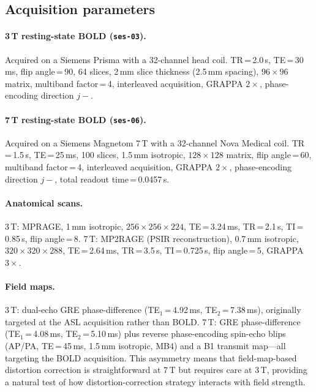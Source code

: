 \documentclass[11pt,a4paper]{article}
\begin{document}
\subsection{Acquisition parameters}

\paragraph{3\,T resting-state BOLD (\texttt{ses-03}).}
Acquired on a Siemens Prisma with a 32-channel head coil.  TR\,=\,2.0\,s, TE\,=\,30\,ms, flip angle\,=\,90\textdegree, 64 slices, 2\,mm slice thickness (2.5\,mm spacing), $96 \times 96$ matrix, multiband factor\,=\,4, interleaved acquisition, GRAPPA $2\times$, phase-encoding direction $j{-}$.

\paragraph{7\,T resting-state BOLD (\texttt{ses-06}).}
Acquired on a Siemens Magnetom 7\,T with a 32-channel Nova Medical coil.  TR\,=\,1.5\,s, TE\,=\,25\,ms, 100 slices, 1.5\,mm isotropic, $128 \times 128$ matrix, flip angle\,=\,60\textdegree, multiband factor\,=\,4, interleaved acquisition, GRAPPA $2\times$, phase-encoding direction $j{-}$, total readout time\,=\,0.0457\,s.

\paragraph{Anatomical scans.}
3\,T: MPRAGE, 1\,mm isotropic, $256 \times 256 \times 224$, TE\,=\,3.24\,ms, TR\,=\,2.1\,s, TI\,=\,0.85\,s, flip angle\,=\,8\textdegree.  7\,T: MP2RAGE (PSIR reconstruction), 0.7\,mm isotropic, $320 \times 320 \times 288$, TE\,=\,2.64\,ms, TR\,=\,3.5\,s, TI\,=\,0.725\,s, flip angle\,=\,5\textdegree, GRAPPA $3\times$.

\paragraph{Field maps.}
3\,T: dual-echo GRE phase-difference (TE$_1$\,=\,4.92\,ms, TE$_2$\,=\,7.38\,ms), originally targeted at the ASL acquisition rather than BOLD.  7\,T: GRE phase-difference (TE$_1$\,=\,4.08\,ms, TE$_2$\,=\,5.10\,ms) plus reverse phase-encoding spin-echo blips (AP/PA, TE\,=\,45\,ms, 1.5\,mm isotropic, MB4) and a B1 transmit map---all targeting the BOLD acquisition.  This asymmetry means that field-map-based distortion correction is straightforward at 7\,T but requires care at 3\,T, providing a natural test of how distortion-correction strategy interacts with field strength.
\end{document}

